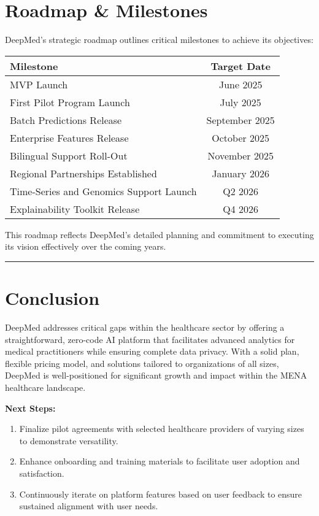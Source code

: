 \documentclass[11pt,a4paper]{article}
\begin{document}
\section{Roadmap \& Milestones}
DeepMed's strategic roadmap outlines critical milestones to achieve its objectives:
\begin{longtable}{@{}lc@{}}
\toprule
\textbf{Milestone}               & \textbf{Target Date}    \\ \midrule
MVP Launch                      & June 2025               \\
First Pilot Program Launch      & July 2025               \\
Batch Predictions Release       & September 2025          \\
Enterprise Features Release     & October 2025            \\
Bilingual Support Roll-Out      & November 2025           \\
Regional Partnerships Established & January 2026            \\
Time-Series and Genomics Support Launch & Q2 2026          \\
Explainability Toolkit Release   & Q4 2026                 \\ \bottomrule
\end{longtable}

This roadmap reflects DeepMed's detailed planning and commitment to executing its vision effectively over the coming years.

\bigskip\hrule\bigskip

\section{Conclusion}
DeepMed addresses critical gaps within the healthcare sector by offering a straightforward, zero-code AI platform that facilitates advanced analytics for medical practitioners while ensuring complete data privacy. With a solid plan, flexible pricing model, and solutions tailored to organizations of all sizes, DeepMed is well-positioned for significant growth and impact within the MENA healthcare landscape.

\bigskip

\noindent\textbf{Next Steps:}
\begin{enumerate}
  \item Finalize pilot agreements with selected healthcare providers of varying sizes to demonstrate versatility.
  \item Enhance onboarding and training materials to facilitate user adoption and satisfaction.
  \item Continuously iterate on platform features based on user feedback to ensure sustained alignment with user needs.
\end{enumerate}
\end{document}
